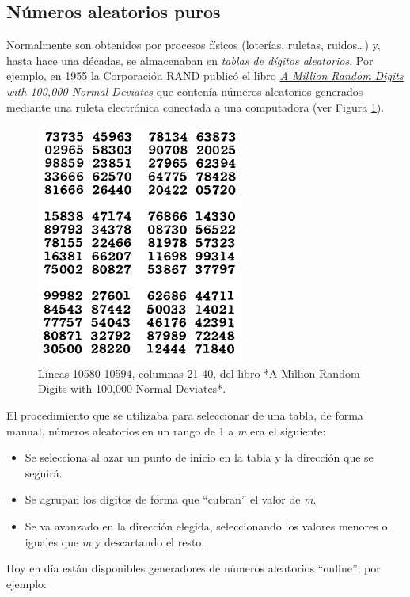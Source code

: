 \documentclass[
]{book}
\theoremstyle{break}
\theoremstyle{nonumberplain}
\begin{document}
\hypertarget{nuxfameros-aleatorios-puros}{%
\subsection{Números aleatorios puros}\label{nuxfameros-aleatorios-puros}}

Normalmente son obtenidos por procesos físicos (loterías, ruletas, ruidos\ldots) y, hasta hace una décadas, se almacenaban en \emph{tablas de dígitos aleatorios}.
Por ejemplo, en 1955 la Corporación RAND publicó el libro \href{https://www.rand.org/pubs/monograph_reports/MR1418.html}{\emph{A Million Random Digits with 100,000 Normal Deviates}} que contenía números aleatorios generados mediante una ruleta electrónica conectada a una computadora (ver Figura \ref{fig:randbook}).

\begin{figure}[!htb]

{\centering \includegraphics[width=0.3\linewidth]{images/RAND} 

}

\caption{Líneas 10580-10594, columnas 21-40, del libro *A Million Random Digits with 100,000 Normal Deviates*.}\label{fig:randbook}
\end{figure}

El procedimiento que se utilizaba para seleccionar de una tabla, de forma manual, números aleatorios
en un rango de 1 a \emph{m} era el siguiente:

\begin{itemize}
\item
  Se selecciona al azar un punto de inicio en la tabla
  y la dirección que se seguirá.
\item
  Se agrupan los dígitos de forma que ``cubran'' el valor de \emph{m}.
\item
  Se va avanzado en la dirección elegida, seleccionando los valores menores o iguales que \emph{m} y descartando el resto.
\end{itemize}

Hoy en día están disponibles generadores de números aleatorios ``online'', por ejemplo:
\end{document}
